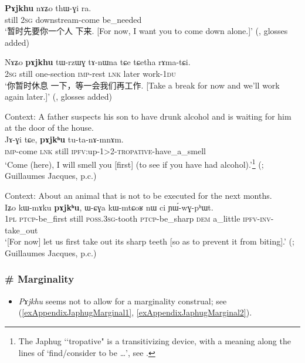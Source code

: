 \begin{exe}
	\ex
	\gll \textbf{Pɤjkhu} nɤʑo thɯ-ɣi ra.\\
	still 2\textsc{sg} downstream-come be\_needed\\
	\glt \lq {\cn 暂时先要你一个人 下来.} [For now, I want you to come down alone.]' (\cite[219]{Jacques2016}, glosses added)
	
	\ex
	\gll Nɤʑo \textbf{pɤjkhu} tɯ-rzɯɣ tɤ-nɯna tɕe tɕetha rɤma-tɕi.\\
	2\textsc{sg} still one-section \textsc{imp}-rest \textsc{lnk} later work-1\textsc{du}\\
	\glt \lq {\cn 你暂时休息 一下，等一会我们再工作.} [Take a break for now and we’ll work again later.]' (\cite[361]{Jacques2016}, glosses added)

	\ex Context: A father suspects his son to have drunk alcohol and is waiting for him at the door of the house.\\
	\gll Jɤ-ɣi tɕe, \textbf{pɤjkʰu} tu-ta-nɤ-mnɤm.\\
	\textsc{imp}-come \textsc{lnk} still \textsc{ipfv}:up-1>2-\textsc{tropative}-have\_a\_smell\\
	\glt \lq Come (here), I will smell you [first] (to see if you have had alcohol).'\footnote{The Japhug \lq\lq tropative" is a transitivizing device, with a meaning along the lines of \lq find/consider to be …', see \textcite[868–870]{Jacques2021}.} (\cite[872]{Jacques2021}; Guillaumes Jacques, p.c.)

	\ex\label{exAppendixJaphugfirst4}
	Context: About an animal that is not to be executed for the next months.\\
	\gll Iʑo kɯ-mɤku \textbf{pɤjkʰu}, ɯ-ɕɣa kɯ-mtɕoʁ nɯ ci ɲɯ́-wɣ-pʰɯt.\\
	1\textsc{pl} \textsc{ptcp}-be\_first still \textsc{poss}.3\textsc{sg}-tooth \textsc{ptcp}-be\_sharp \textsc{dem} a\_little \textsc{ipfv}-\textsc{inv}-take\_out\\
	\glt \lq [For now] let us first take out its sharp teeth [so as to prevent it from biting].' (\cite[602]{Jacques2021}; Guillaumes Jacques, p.c.)
\end{exe}


\subsubsection{\# Marginality}\label{appendixJaphugMarginal}
\begin{itemize}
	\item \textit{Pɤjkhu} seems not to allow for a marginality construal; see (\ref{exAppendixJaphugMarginal1}, \ref{exAppendixJaphugMarginal2}).
\end{itemize}

